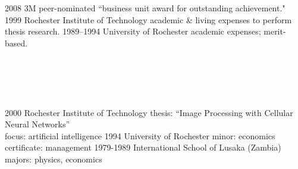 \documentclass[]{friggeri-cv} %
\begin{document}
\section{{} {} {\normalsize {}~~}}

\begin{entrylist}
\entry
{2008}
{3M}
{}
{peer-nominated ``business unit award for outstanding achievement."}
\entry
{1999}
{Rochester Institute of Technology}
{}
{academic \& living expenses to perform thesis research.}
\entry
{1989--1994}
{University of Rochester}
{}
{academic expenses; merit-based.}
\end{entrylist}



\section{{} {} {\normalsize {}~~}}

\begin{entrylist}
\entry
{2000}
{Rochester Institute of Technology}
{}
{thesis: ``Image Processing with Cellular Neural Networks''\\
focus: artificial intelligence}
\entry
{1994}
{University of Rochester}
{}
{minor: economics\\
certificate: management} 
\entry
{1979-1989}
{International School of Lusaka (Zambia)}
{}
{majors: physics, economics}
\end{entrylist}
\end{document}

